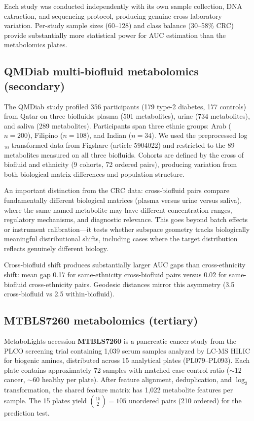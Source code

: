 \documentclass{article}
\begin{document}
Each study was conducted independently with its own sample collection, DNA extraction, and sequencing protocol, producing genuine cross-laboratory variation. Per-study sample sizes (60--128) and class balance (30--58\% CRC) provide substantially more statistical power for AUC estimation than the metabolomics plates.

\subsection{QMDiab multi-biofluid metabolomics (secondary)}
\label{sec:qmdiab_data}

The QMDiab study \citep{yousri2015metabolic} profiled 356 participants (179 type-2 diabetes, 177 controls) from Qatar on three biofluids: plasma (501 metabolites), urine (734 metabolites), and saliva (289 metabolites). Participants span three ethnic groups: Arab ($n = 200$), Filipino ($n = 108$), and Indian ($n = 34$). We used the preprocessed log$_{10}$-transformed data from Figshare (article 5904022) and restricted to the 89 metabolites measured on all three biofluids. Cohorts are defined by the cross of biofluid and ethnicity (9 cohorts, 72 ordered pairs), producing variation from both biological matrix differences and population structure.

An important distinction from the CRC data: cross-biofluid pairs compare fundamentally different biological matrices (plasma versus urine versus saliva), where the same named metabolite may have different concentration ranges, regulatory mechanisms, and diagnostic relevance. This goes beyond batch effects or instrument calibration---it tests whether subspace geometry tracks biologically meaningful distributional shifts, including cases where the target distribution reflects genuinely different biology.

Cross-biofluid shift produces substantially larger AUC gaps than cross-ethnicity shift: mean gap 0.17 for same-ethnicity cross-biofluid pairs versus 0.02 for same-biofluid cross-ethnicity pairs. Geodesic distances mirror this asymmetry (3.5 cross-biofluid vs 2.5 within-biofluid).

\subsection{MTBLS7260 metabolomics (tertiary)}
\label{sec:metab_data}

MetaboLights accession \textbf{MTBLS7260} \citep{leonletelier2024contributions} is a pancreatic cancer study from the PLCO screening trial containing 1{,}039 serum samples analyzed by LC-MS HILIC for biogenic amines, distributed across 15 analytical plates (PL079--PL093). Each plate contains approximately 72 samples with matched case-control ratio ($\sim$12 cancer, $\sim$60 healthy per plate). After feature alignment, deduplication, and $\log_2$ transformation, the shared feature matrix has 1{,}022 metabolite features per sample. The 15 plates yield $\binom{15}{2} = 105$ unordered pairs (210 ordered) for the prediction test.
\end{document}
